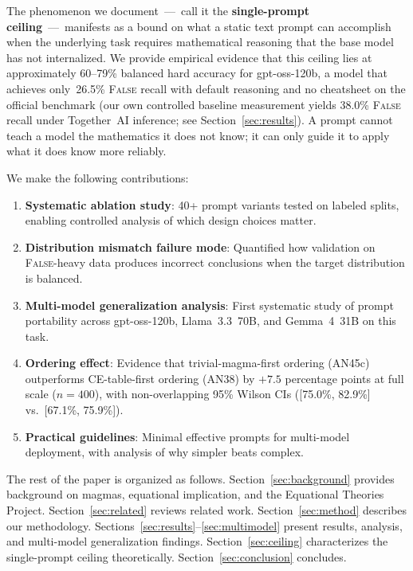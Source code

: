 \documentclass[11pt]{article}
\begin{document}
The phenomenon we document~---~call it the \textbf{single-prompt
ceiling}~---~manifests as a bound on what a static text prompt can
accomplish when the underlying task requires mathematical reasoning that
the base model has not internalized. We provide empirical evidence that
this ceiling lies at approximately 60--79\% balanced hard accuracy for
gpt-oss-120b, a model that achieves only~26.5\% \textsc{False} recall
with default reasoning and no cheatsheet on the official benchmark (our
own controlled baseline measurement yields 38.0\% \textsc{False} recall
under Together~AI inference; see Section~\ref{sec:results}). A
prompt cannot teach a model the mathematics it does not know; it can
only guide it to apply what it does know more reliably.

We make the following contributions:
\begin{enumerate}
  \item \textbf{Systematic ablation study}: 40+ prompt variants tested
    on labeled splits, enabling controlled analysis of which design
    choices matter.
  \item \textbf{Distribution mismatch failure mode}: Quantified how
    validation on \textsc{False}-heavy data produces incorrect
    conclusions when the target distribution is balanced.
  \item \textbf{Multi-model generalization analysis}: First systematic
    study of prompt portability across gpt-oss-120b, Llama~3.3~70B,
    and Gemma~4~31B on this task.
  \item \textbf{Ordering effect}: Evidence that trivial-magma-first
    ordering (AN45c) outperforms CE-table-first ordering (AN38) by
    $+7.5$ percentage points at full scale ($n=400$), with
    non-overlapping 95\% Wilson CIs ([75.0\%, 82.9\%] vs.\
    [67.1\%, 75.9\%]).
  \item \textbf{Practical guidelines}: Minimal effective prompts for
    multi-model deployment, with analysis of why simpler beats complex.
\end{enumerate}

The rest of the paper is organized as follows. Section~\ref{sec:background}
provides background on magmas, equational implication, and the
Equational Theories Project. Section~\ref{sec:related} reviews related
work. Section~\ref{sec:method} describes our methodology.
Sections~\ref{sec:results}--\ref{sec:multimodel} present results,
analysis, and multi-model generalization findings.
Section~\ref{sec:ceiling} characterizes the single-prompt ceiling
theoretically. Section~\ref{sec:conclusion} concludes.
\end{document}
